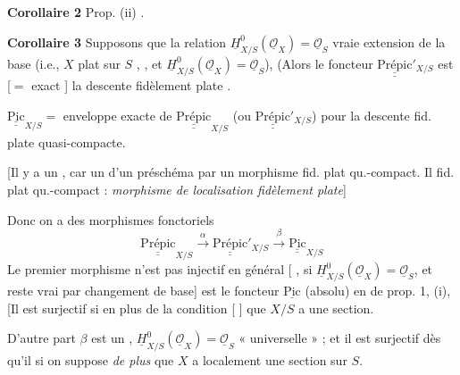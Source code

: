 \documentclass[11pt,a4paper]{article}
\begin{document}
\textbf{Corollaire 2}   \ill{} Prop. (ii) \ill{} \ill{} \ill{} .

\textbf{Corollaire 3} Supposons que la relation $\underline{H}^{0}_{X/S}(\underline{\mathcal{O}}_{X}) = \underline{\mathcal{O}}_{S}$  vraie   extension de la base (i.e., $X$  plat sur $S$ \ill{} \ill{}, , et $\underline{H}^{0}_{X/S}(\underline{\mathcal{O}}_{X}) = \underline{\mathcal{O}}_{S}$), (Alors le foncteur $\underline{\underline{\text{Prépic}}}'_{X/S}$ est  [$=$ exact ] \ill{} la descente fidèlement plate .

\struck{\ill{}}

$\underline{\underline{\mathrm{Pic}}}_{X/S} =$ enveloppe exacte de $\underline{\underline{\text{Prépic}}}_{X/S}$ (ou $\underline{\underline{\text{Prépic}}}'_{X/S}$) pour la descente fid. plate quasi-compacte.

[Il y a un , car un \emph{} \ill{} \ill{} d'un préschéma \ill{}  \ill{} \ill{} \ill{} \ill{}  par un morphisme fid. plat qu.-compact. Il    \ill{} \ill{} \ill{} fid. plat qu.-compact :    \emph{morphisme de localisation fidèlement plate}]

Donc on a des morphismes fonctoriels
\[
\underline{\underline{\text{Prépic}}}_{X/S} \xrightarrow{\alpha} \underline{\underline{\text{Prépic}}}'_{X/S} \xrightarrow{\beta} \underline{\underline{\mathrm{Pic}}}_{X/S}
\]
Le premier morphisme n'est pas injectif en général [ \ill{}, si $\underline{H}^{0}_{X/S}(\underline{\mathcal{O}}_{X}) = \underline{\mathcal{O}}_{S}$, et \ill{} \ill{} reste vrai par changement de base] est le foncteur $\underline{\mathrm{Pic}}$ (absolu)  en  de prop. 1, (i), [Il est surjectif si \ill{}  en plus de la condition \ill{} [ ] que $X/S$ a une section. \struck{\ill{}}

D'autre part $\beta$ est un , \ill{}  $\underline{H}^{0}_{X/S}(\underline{\mathcal{O}}_{X}) = \underline{\mathcal{O}}_{S}$ « universelle » ; et il est surjectif dès qu'il  si on suppose \emph{de plus} que \struck{\ill{}} $X$ a localement une section sur $S$.
\end{document}
